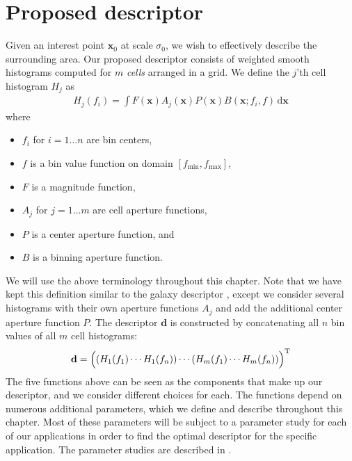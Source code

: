 \documentclass[thesis.tex]{subfiles}
\def\x{\mathbf{x}}
\def\d{\mathbf{d}}
\begin{document}
\chapter{Proposed descriptor}
%
Given an interest point $\x_0$ at scale $\sigma_0$, we wish to effectively describe the surrounding area. Our proposed descriptor consists of weighted smooth histograms computed for $m$ \textit{cells} arranged in a grid. We define the $j$'th cell histogram $H_j$ as
%
\begin{align}
\label{eq:proposed_histogram}
H_j(f_i) = \int F(\x) A_j (\x) P (\x) B(\x; f_i,f) \,\text{d} \x
\end{align}
%
where
%
\begin{itemize}
\item[] $f_i$ for $i = 1 \dots n$ are bin centers,
\item[] $f$ is a bin value function on domain $[f_\text{min},f_\text{max}]$,
\item[] $F$ is a magnitude function,
\item[] $A_j$ for $j = 1 \dots m$ are cell aperture functions,
\item[] $P$ is a center aperture function, and
\item[] $B$ is a binning aperture function.
\end{itemize}
%
We will use the above terminology throughout this chapter. Note that we have kept this definition similar to the galaxy descriptor \cite{pedersen2013shape}, except we consider several histograms with their own aperture functions $A_j$ and add the additional center aperture function $P$. The descriptor $\d$ is constructed by concatenating all $n$ bin values of all $m$ cell histograms:
%
\begin{align}
\label{eq:proposed_descriptor}
\d = \Bigl( \left(H_1(f_1) \cdots H_1(f_n)\right) \cdots (H_m(f_1) \cdots H_m(f_n)) \Bigr) ^\text{T}
\end{align}
%
The five functions above can be seen as the components that make up our descriptor, and we consider different choices for each. The functions depend on numerous additional parameters, which we define and describe throughout this chapter. Most of these parameters will be subject to a parameter study for each of our applications in order to find the optimal descriptor for the specific application. The parameter studies are described in .
%
\end{document}
